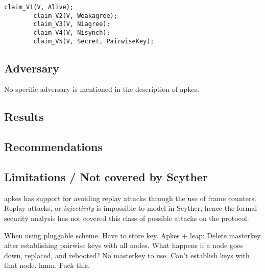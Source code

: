 \begin{lstlisting}[caption={Security claims for role V in APKES.}, label={lst:claims-v-apkes}]
		claim_V1(V, Alive);
		claim_V2(V, Weakagree);
		claim_V3(V, Niagree);
		claim_V4(V, Nisynch);
		claim_V5(V, Secret, PairwiseKey);
\end{lstlisting}


\subsection{Adversary}

No specific adversary is mentioned in the description of \gls{apkes}. 



\subsection{Results}

\subsection{Recommendations}



\subsection{Limitations / Not covered by Scyther}


\gls{apkes} has support for avoiding replay attacks through the use of frame counters. Replay attacks, or \emph{injectivity} is impossible to model in Scyther, hence the formal security analysis has not covered this class of possible attacks on the protocol. 

When using pluggable scheme. Have to store key. Apkes + leap: Delete masterkey after establishing pairwise keys with all nodes. What happens if a node goes down, replaced, and rebooted? No masterkey to use. Can't establish keys with that node. hmm. Fuck this.






